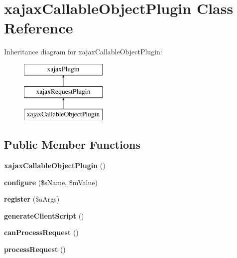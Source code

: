 \hypertarget{classxajaxCallableObjectPlugin}{
\section{xajaxCallableObjectPlugin Class Reference}
\label{classxajaxCallableObjectPlugin}
}
Inheritance diagram for xajaxCallableObjectPlugin:\begin{figure}[H]
\begin{center}
\leavevmode
\includegraphics[height=3.000000cm]{classxajaxCallableObjectPlugin}
\end{center}
\end{figure}
\subsection*{Public Member Functions}
\begin{DoxyCompactItemize}
\item 
\hypertarget{classxajaxCallableObjectPlugin_aad0f4ce72c5dcf05ebc194062f63e6f7}{
{\bfseries xajaxCallableObjectPlugin} ()}
\label{classxajaxCallableObjectPlugin_aad0f4ce72c5dcf05ebc194062f63e6f7}

\item 
\hypertarget{classxajaxCallableObjectPlugin_a1d77a7f346dec476f0041e739628873f}{
{\bfseries configure} (\$sName, \$mValue)}
\label{classxajaxCallableObjectPlugin_a1d77a7f346dec476f0041e739628873f}

\item 
\hypertarget{classxajaxCallableObjectPlugin_a2c5d3948d0eaebf24d277ffc663590a1}{
{\bfseries register} (\$aArgs)}
\label{classxajaxCallableObjectPlugin_a2c5d3948d0eaebf24d277ffc663590a1}

\item 
\hypertarget{classxajaxCallableObjectPlugin_afe733a09720ca86cc385135c0d3f2b45}{
{\bfseries generateClientScript} ()}
\label{classxajaxCallableObjectPlugin_afe733a09720ca86cc385135c0d3f2b45}

\item 
\hypertarget{classxajaxCallableObjectPlugin_a4ce25255cdfd760f00a0ec7f4b3eefb5}{
{\bfseries canProcessRequest} ()}
\label{classxajaxCallableObjectPlugin_a4ce25255cdfd760f00a0ec7f4b3eefb5}

\item 
\hypertarget{classxajaxCallableObjectPlugin_a3fe9efd9637d30bd7ee3503bfcc068ee}{
{\bfseries processRequest} ()}
\label{classxajaxCallableObjectPlugin_a3fe9efd9637d30bd7ee3503bfcc068ee}

\end{DoxyCompactItemize}
